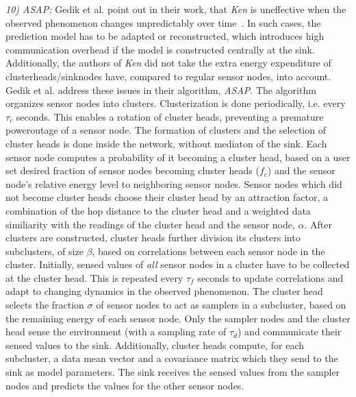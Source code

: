 \par
\textit{10) ASAP:}
Gedik et al. point out in their work, that \textit{Ken} is uneffective when the
observed phenomenon changes unpredictably over time~\cite{gedik2007asap}. In
such cases, the prediction model has to be adapted or reconstructed, which
introduces high communication overhead if the model is constructed centrally at
the sink. Additionally, the authors of \textit{Ken} did not take the
extra energy expenditure of clusterheads/sinknodes have, compared to regular
sensor nodes, into account. Gedik et al. address these issues in their
algorithm, \textit{ASAP}. The algorithm organizes sensor nodes into clusters.
Clusterization is done periodically, i.e. every $ \tau_c $ seconds. This
enables a rotation of cluster heads, preventing a premature poweroutage of a
sensor node. The formation of clusters and the selection of cluster heads is
done inside the network, without mediaton of the sink. Each sensor node
computes a probability of it becoming a cluster head, based on a user set
desired fraction of sensor nodes becoming cluster heads ($ f_c $) and the
sensor node's relative energy level to neighboring sensor nodes. Sensor nodes
which did not become cluster heads choose their cluster head by an attraction
factor, a combination of the hop distance to the cluster head and a weighted
data similiarity with the readings of the cluster head and the sensor node, $
\alpha $. After clusters are constructed, cluster heads further division its
clusters into subclusters, of size $ \beta $, based on correlations between
each sensor node in the cluster. Initially, sensed values of \textit{all}
sensor nodes in a cluster have to be collected at the cluster head. This is
repeated every $ \tau_f $ seconds to update correlations and adapt to changing
dynamics in the observed phenomenon. The cluster head selects the fraction $
\sigma $ of sensor nodes to act as samplers in a subcluster, based on the
remaining energy of each sensor node. Only the sampler nodes and the cluster
head sense the environment (with a sampling rate of $ \tau_d $) and communicate
their sensed values to the sink. Additionally, cluster heads compute,
for each subcluster, a data mean vector and a covariance matrix which they send
to the sink as model parameters. The sink receives the sensed
values from the sampler nodes and predicts the values for the other sensor
nodes.

